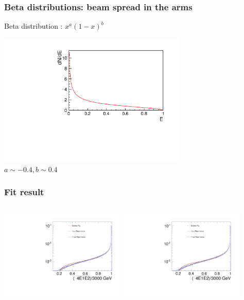 \documentclass{beamer}
\begin{document}
\begin{frame}
\frametitle{Beta distributions: beam spread in the
arms}\label{slide:betadistspreadarm} 
Beta distribution : $x^a(1-x)^b$ 
\begin{center}
\includegraphics[width=9cm]{BetaFunction_beamspreadarms.pdf}\\
$a\sim-0.4, b\sim0.4$
\end{center}
\end{frame}

\begin{frame}
\frametitle{Fit result}\label{slide:fitres}
\begin{columns}[c]
\column{6cm}
\includegraphics[width=6cm,page=1]{res_FCAL.pdf}
\column{6cm}
\includegraphics[width=6cm,page=3]{res_FCAL.pdf}
\end{columns}
\end{frame}
\end{document}
